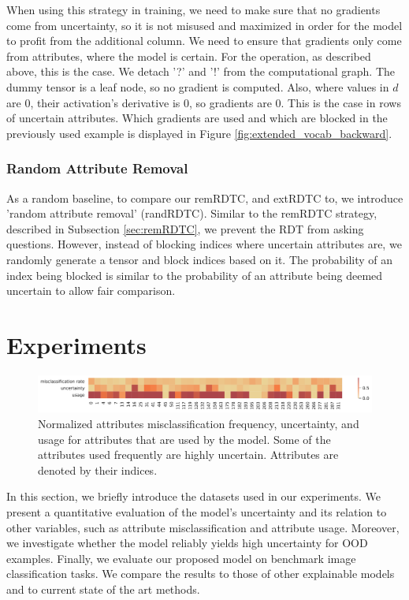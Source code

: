 \documentclass[a4paper,cleardoubleempty,BCOR1cm, 11pt]{report}
\begin{document}
When using this strategy in training, we need to make sure that no gradients come from uncertainty, so it is not misused and maximized in order for the model to profit from the additional column. We need to ensure that gradients only come from attributes, where the model is certain. For the operation, as described above, this is the case. We detach '?' and '!' from the computational graph. The dummy tensor is a leaf node, so no gradient is computed. Also, where values  in $d$ are $0$, their activation's derivative is $0$, so gradients are $0$. This is the case in rows of uncertain attributes. Which gradients are used and which are blocked in the previously used example is displayed in Figure \ref{fig:extended_vocab_backward}.




\subsection{Random Attribute Removal}
As a random baseline, to compare our remRDTC, and extRDTC to, we introduce 'random attribute removal' (randRDTC).
Similar to the remRDTC strategy, described in Subsection \ref{sec:remRDTC}, we prevent the RDT from asking questions. However, instead of blocking indices where uncertain attributes are, we randomly generate a tensor and block indices based on it. The probability of an index being blocked is similar to the probability of an attribute being deemed uncertain to allow fair comparison.




\chapter{Experiments}
\begin{figure}[t!]
	\centering
	\includegraphics[width=1\textwidth]{images/attr_heatmap_short.pdf} 
	\caption{Normalized attributes misclassification frequency, uncertainty, and usage for attributes that are used by the model. Some of the attributes used frequently are highly uncertain. Attributes are denoted by their indices.}
	\label{fig:less_attrs}
\end{figure}
In this section, we briefly introduce the datasets used in our experiments. We present a quantitative evaluation of the model's uncertainty and its relation to other variables, such as attribute misclassification and attribute usage. Moreover, we investigate whether the model reliably yields high uncertainty for OOD examples. Finally, we evaluate our proposed model on benchmark image classification tasks. We compare the results to those of other explainable models and to current state of the art methods.
\end{document}
